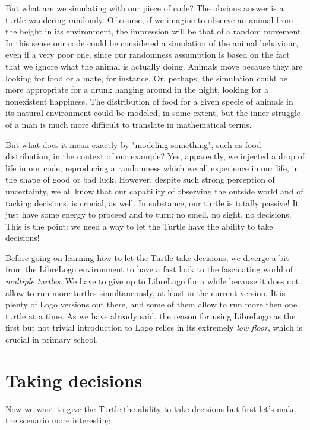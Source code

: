 But what are we simulating with our piece of code? The obvious answer is a turtle wandering randomly. Of course, if we imagine to observe an animal from the height in its environment,  the impression will be that of a random movement.  In this sense our code could be considered a simulation of the animal behaviour, even if a very poor one, since our randomness assumption is based on the fact that we ignore what the animal is actually doing. Animals move because they are looking for food or a mate, for instance. Or, perhaps, the simulation could be more appropriate for a drunk hanging around in the night, looking for a nonexistent happiness. The distribution of food for a given specie of animals in its natural environment could be modeled, in some extent, but the inner struggle of a man is much more difficult to translate in mathematical terms. 

But what does it mean exactly by "modeling something", such as food distribution, in the context of our example? Yes, apparently, we injected a drop of life in our code, reproducing a randomness which we all experience in our life, in the shape of good or bad luck. However, despite such strong perception of uncertainty, we all know that our capability of observing the outside world and of tacking decisions, is crucial, as well. In substance, our turtle is totally passive! It just have some energy to proceed and to turn: no smell, no sight, no decisions. This is the point: we need a way to let the Turtle have the ability to take decisions!

Before going on learning how to let the Turtle take decisions, we diverge a bit from the LibreLogo environment to have a fast look to the fascinating world of \textit{multiple turtles}. We have to give up to LibreLogo for a while because it does not allow to run more turtles simultaneously, at least in the current version. It is plenty of Logo versions out there, and some of them allow to run more then one turtle at a time. As we have already said, the reason for using LibreLogo as the first but not trivial introduction to Logo relies in its extremely \textit{low floor}, which is crucial in primary school. 

\vskip 1cm\chapter{Taking decisions} \label{cap:decisioni}

Now we want to give the Turtle the ability to take decisions but first let's make the scenario more interesting.

